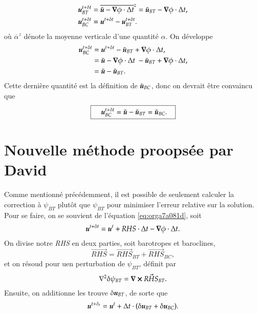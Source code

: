 \documentclass[10pt]{article}
\numberwithin{equation}{section}
\newcommand{\uu}{\vb*{u}}
\newcommand{\zmean}[1]{\overline{#1}^z}
\begin{document}
\begin{subequations}
\begin{align}
   & \uu^{t+\delta t}_{BT} = \zmean{\tilde{\uu} - \gradient{\phi} \cdot \Delta t}  = \tilde{\uu}_{BT} - \gradient{\phi} \cdot \Delta t,\\
   & \uu^{t+\delta t}_{BC} = \uu^{t+\delta t} - \uu^{t+\delta t}_{BT}.
\end{align}
\end{subequations}
où \(\zmean{\alpha}\) dénote la moyenne verticale d'une quantité \(\alpha\).
On développe
\begin{align}
   \uu^{t+\delta t}_{BC}
   &= \uu^{t+\delta t} - \tilde{\uu}_{BT} + \gradient{\phi}\cdot \Delta t, \nonumber\\
   &= \tilde{\uu} - \gradient{\phi}\cdot \Delta t\ - \tilde{\uu}_{BT} + \gradient{\phi}\cdot \Delta t, \nonumber\\
   &= \tilde{\uu} - \tilde{\uu}_{BT}.
\end{align}
Cette dernière quantité est la définition de \(\tilde{\uu}_{BC}\), donc on devrait être convaincu que
\begin{equation}
   \boxed{\hspace{0.4cm}\uu^{t+\delta t}_{BC}
   = \tilde{\uu} - \tilde{\uu}_{BT} = \tilde{\uu}_{BC}.\hspace{0.3cm}}
\end{equation}

\section{Nouvelle méthode proopsée par David}
\label{sec:orgf1f5756}
Comme mentionné précédemment, il est possible de seulement calculer la correction à \(\psi_{BT}\) plutôt que \(\psi_{BT}\) pour minimiser l'erreur relative sur la solution.
Pour se faire, on se souvient de l'équation \ref{eq:orga7a081d}, soit
\begin{equation}
   \uu^{t+\delta t} =
   \uu^t + RHS\cdot \Delta t
   - \gradient{\phi}\cdot \Delta t.
\end{equation}
On divise notre \emph{RHS} en deux parties, soit barotropes et baroclines,
\begin{equation}
   \vec{RHS} = \vec{RHS}_{BT} + \vec{RHS}_{BC},
\end{equation}
et on résoud pour uen perturbation de \(\psi_{BT}\), définit par
\begin{equation}
   \laplacian{\delta \psi_{BT}} = \curl{\vec{RHS}_{BT}}.
\end{equation}
Ensuite, on additionne les trouve \(\delta \uu_{BT}\), de sorte que
\begin{equation}
   \uu^{t+\delta_t} = \uu^{t} + \Delta t \cdot \qty(\delta \uu_{BT} + \delta \uu_{BC}).
\end{equation}
\end{document}
